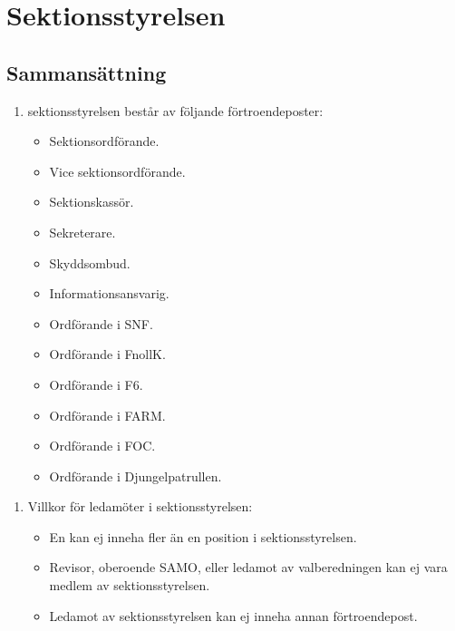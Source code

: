 \documentclass[11pt,a4paper]{article}
\begin{document}
\newpage

\section{Sektionsstyrelsen}

\subsection{Sammansättning}

\begin{enumerate}[\thesubsection .1]

  \item sektionsstyrelsen består av följande förtroendeposter:
    \begin{itemize}
      \item Sektionsordförande.
      \item Vice sektionsordförande.
      \item Sektionskassör.
      \item Sekreterare.
      \item Skyddsombud.
      \item Informationsansvarig.
      \item Ordförande i SNF.
      \item Ordförande i FnollK.
      \item Ordförande i F6.
      \item Ordförande i FARM.
      \item Ordförande i FOC.
      \item Ordförande i Djungelpatrullen.
    \end{itemize}

\end{enumerate}

\begin{enumerate}[\thesubsection .2]
\item Villkor för ledamöter i sektionsstyrelsen:

\begin{itemize}
\item En kan ej inneha fler än en position i sektionsstyrelsen.
\item Revisor, oberoende SAMO, eller ledamot av valberedningen kan ej vara medlem av sektionsstyrelsen.
\item Ledamot av sektionsstyrelsen kan ej inneha annan förtroendepost.
\end{itemize}

\end{enumerate}
\end{document}
